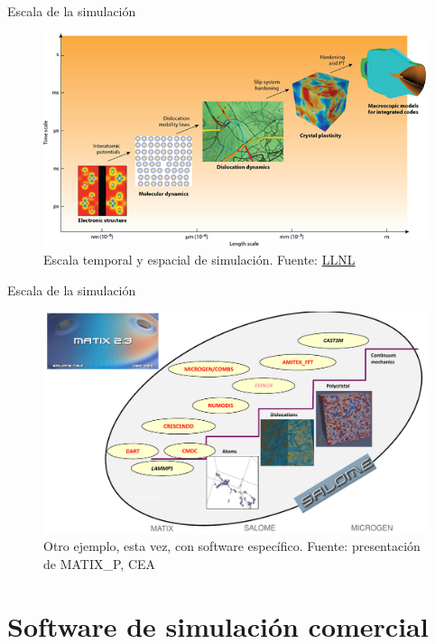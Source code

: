 \documentclass[12pt]{beamer}
\begin{document}
\begin{frame}{Escala de la simulación}
	\begin{figure}
		\centering
		\includegraphics[width=1\linewidth]{ms11}
		\caption{Escala temporal y espacial de simulación. Fuente: \href{https://manufacturing.llnl.gov/content/assets/images/ms/ms11.jpg}{LLNL}}
		\label{fig:ms11}
	\end{figure}
\end{frame}

\begin{frame}{Escala de la simulación}
	\begin{figure}
		\centering
		\includegraphics[width=1\linewidth]{cea_simulation_scale}
		\caption{Otro ejemplo, esta vez, con software específico. Fuente: presentación de MATIX\_P, CEA}
		\label{fig:ceasimulationscale}
	\end{figure}
	
\end{frame}

\section{Software de simulación comercial}
\end{document}

